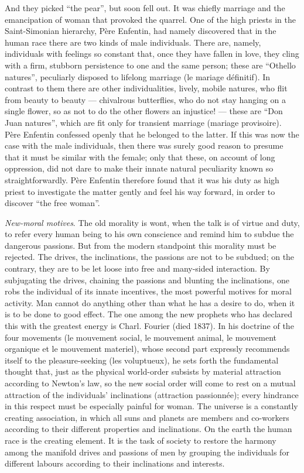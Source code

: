\documentclass[12pt,a4paper,openany]{book}
\newcommand{\opage}[1]{\marginnote{\footnotesize\textit{[#1]}}}
\begin{document}
And they picked ``the pear'', but soon fell out.
It was chiefly marriage and the emancipation of woman
that provoked the quarrel. One of the high priests
in the Saint-Simonian hierarchy, Père Enfentin, had
namely discovered that in the human race there are two
kinds of male individuals. There are, namely, individuals with
feelings so constant that, once they have
fallen in love, they cling with a firm, stubborn persistence
to one and the same person; these are ``Othello natures'',
peculiarly disposed to lifelong marriage
(le mariage définitif). In contrast to them there are
other individualities, lively, mobile natures, who
flit from beauty to beauty --- chivalrous butterflies,
who do not stay hanging on a single flower,
so as not to do the other flowers an injustice! --- these are
``Don Juan natures'', which are fit only for
\setcounter{footnote}{0}%
\opage{82}transient marriage (mariage provisoire). Père Enfentin
confessed openly that he belonged to the latter. If this
was now the case with the male individuals,
then there was surely good reason to presume that it must
be similar with the female;
only that these, on account of long oppression,
did not dare to make their innate natural peculiarity known so
straightforwardly. Père Enfentin therefore found that
it was his duty as high priest to investigate
the matter gently and feel his way forward, in order to discover ``the
free woman''.

\emph{New-moral motives}. The old morality
is wont, when the talk is of virtue and duty, to refer
every human being to his own conscience and
remind him to subdue the dangerous passions. But
from the modern standpoint this morality must be rejected.
The drives, the inclinations, the passions are not to be
subdued; on the contrary, they are to be let loose into free and many-sided
interaction. By subjugating the drives, chaining
the passions and blunting the inclinations,
one robs the individual of its innate incentives, the most powerful
motives for moral activity. Man
cannot do anything other than what he has a desire to do, when
it is to be done to good effect. The one among the new prophets
who has declared this with the greatest energy is Charl.
Fourier (died 1837). In his doctrine of the four movements
(le mouvement social, le mouvement animal, le mouvement
organique et le mouvement materiel), whose second
part expressly recommends itself to the pleasure-seeking (les
voluptueux), he sets forth the fundamental thought that, just as
the physical world-order subsists by material
attraction according to Newton's law, so the new
\setcounter{footnote}{0}%
\opage{83}social order will come to rest on a mutual
attraction of the individuals' inclinations (attraction
passionnée); every hindrance in this respect must
be especially painful for woman. The universe is a constantly
creating association, in which all suns and planets
are members and co-workers according to their different
properties and inclinations. On the earth the human race
is the creating element. It is the task of society
to restore the harmony among the manifold drives and passions of men
by grouping the individuals for different labours according to their inclinations
and interests.
\end{document}
